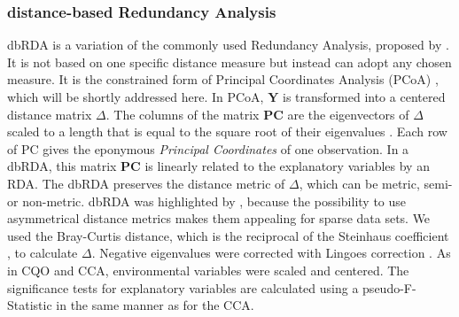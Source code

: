 \documentclass[a4paper,11pt]{article}
\begin{document}
	\subsubsection{distance-based Redundancy Analysis}
	    dbRDA is a variation of the commonly used Redundancy Analysis, proposed by \citet{Legendre1999}.
        It is not based on one specific distance measure but instead can adopt any chosen measure.
		It is the constrained form of Principal Coordinates Analysis (PCoA) \citep{Legendre1999}, which will be shortly addressed here.
		In PCoA, $\mathbf{Y}$ is transformed into a centered distance matrix $\Delta$.
		The columns of the matrix $\mathbf{PC}$ are the eigenvectors of $\Delta$ scaled to a length that is equal to the square root of their eigenvalues \citep{gower1966some}.
		Each row of PC gives the eponymous \textit{Principal Coordinates} of one observation.
		In a dbRDA, this matrix $\mathbf{PC}$ is linearly related to the explanatory variables by an RDA.
		The dbRDA preserves the distance metric of $\Delta$, which can be metric, semi- or non-metric.
		dbRDA was highlighted by \citet{Szocs2015}, because the possibility to use asymmetrical distance metrics makes them appealing for sparse data sets. 
	    We used the Bray-Curtis distance, which is the reciprocal of the Steinhaus coefficient  \citep{motyka1947zadaniach}, to calculate $\Delta$.
		Negative eigenvalues were corrected with Lingoes correction \citep{lingoes1971some}.
		As in CQO and CCA, environmental variables were scaled and centered. 
		The significance tests for explanatory variables are calculated using a pseudo-F-Statistic in the same manner as for the CCA.\\
		
\end{document}
